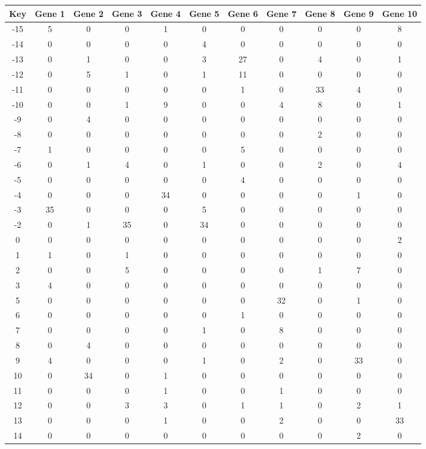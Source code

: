 \begin{tabular}{|c|c|c|c|c|c|c|c|c|c|c|}
\hline
Key & Gene 1 & Gene 2 & Gene 3 & Gene 4 & Gene 5 & Gene 6 & Gene 7 & Gene 8 & Gene 9 & Gene 10 \\
\hline
-15 & 5 & 0 & 0 & 1 & 0 & 0 & 0 & 0 & 0 & 8 \\
-14 & 0 & 0 & 0 & 0 & 4 & 0 & 0 & 0 & 0 & 0 \\
-13 & 0 & 1 & 0 & 0 & 3 & 27 & 0 & 4 & 0 & 1 \\
-12 & 0 & 5 & 1 & 0 & 1 & 11 & 0 & 0 & 0 & 0 \\
-11 & 0 & 0 & 0 & 0 & 0 & 1 & 0 & 33 & 4 & 0 \\
-10 & 0 & 0 & 1 & 9 & 0 & 0 & 4 & 8 & 0 & 1 \\
-9 & 0 & 4 & 0 & 0 & 0 & 0 & 0 & 0 & 0 & 0 \\
-8 & 0 & 0 & 0 & 0 & 0 & 0 & 0 & 2 & 0 & 0 \\
-7 & 1 & 0 & 0 & 0 & 0 & 5 & 0 & 0 & 0 & 0 \\
-6 & 0 & 1 & 4 & 0 & 1 & 0 & 0 & 2 & 0 & 4 \\
-5 & 0 & 0 & 0 & 0 & 0 & 4 & 0 & 0 & 0 & 0 \\
-4 & 0 & 0 & 0 & 34 & 0 & 0 & 0 & 0 & 1 & 0 \\
-3 & 35 & 0 & 0 & 0 & 5 & 0 & 0 & 0 & 0 & 0 \\
-2 & 0 & 1 & 35 & 0 & 34 & 0 & 0 & 0 & 0 & 0 \\
0 & 0 & 0 & 0 & 0 & 0 & 0 & 0 & 0 & 0 & 2 \\
1 & 1 & 0 & 1 & 0 & 0 & 0 & 0 & 0 & 0 & 0 \\
2 & 0 & 0 & 5 & 0 & 0 & 0 & 0 & 1 & 7 & 0 \\
3 & 4 & 0 & 0 & 0 & 0 & 0 & 0 & 0 & 0 & 0 \\
5 & 0 & 0 & 0 & 0 & 0 & 0 & 32 & 0 & 1 & 0 \\
6 & 0 & 0 & 0 & 0 & 0 & 1 & 0 & 0 & 0 & 0 \\
7 & 0 & 0 & 0 & 0 & 1 & 0 & 8 & 0 & 0 & 0 \\
8 & 0 & 4 & 0 & 0 & 0 & 0 & 0 & 0 & 0 & 0 \\
9 & 4 & 0 & 0 & 0 & 1 & 0 & 2 & 0 & 33 & 0 \\
10 & 0 & 34 & 0 & 1 & 0 & 0 & 0 & 0 & 0 & 0 \\
11 & 0 & 0 & 0 & 1 & 0 & 0 & 1 & 0 & 0 & 0 \\
12 & 0 & 0 & 3 & 3 & 0 & 1 & 1 & 0 & 2 & 1 \\
13 & 0 & 0 & 0 & 1 & 0 & 0 & 2 & 0 & 0 & 33 \\
14 & 0 & 0 & 0 & 0 & 0 & 0 & 0 & 0 & 2 & 0 \\
\hline
\end{tabular}